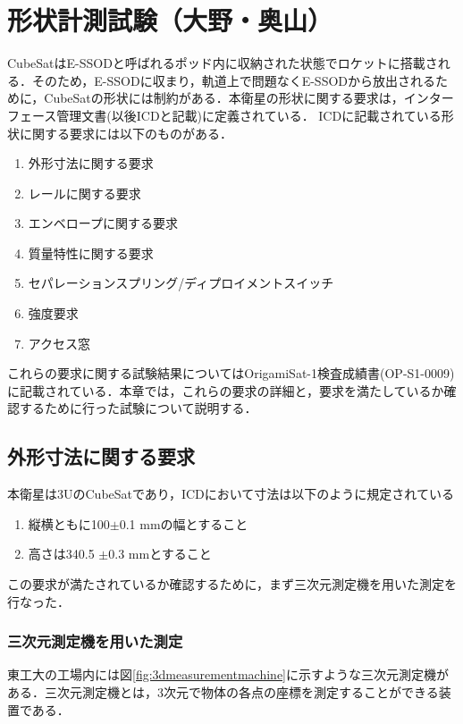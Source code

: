 \section{形状計測試験（大野・奥山）}
\label{chap:shapemeasurement}

CubeSatはE-SSODと呼ばれるポッド内に収納された状態でロケットに搭載される．そのため，E-SSODに収まり，軌道上で問題なくE-SSODから放出されるために，CubeSatの形状には制約がある．本衛星の形状に関する要求は，インターフェース管理文書(以後ICDと記載)に定義されている．
ICDに記載されている形状に関する要求には以下のものがある．
\begin{enumerate}
	\item 外形寸法に関する要求
	\item レールに関する要求
	\item エンベロープに関する要求
	\item 質量特性に関する要求
	\item セパレーションスプリング/ディプロイメントスイッチ
	\item 強度要求
	\item アクセス窓
\end{enumerate}

これらの要求に関する試験結果についてはOrigamiSat-1検査成績書(OP-S1-0009)に記載されている．本章では，これらの要求の詳細と，要求を満たしているか確認するために行った試験について説明する．

\subsection{外形寸法に関する要求}

本衛星は3UのCubeSatであり，ICDにおいて寸法は以下のように規定されている

\begin{enumerate}
	\item 縦横ともに100$\pm$0.1 mmの幅とすること
	\item 高さは340.5 $\pm$0.3 mmとすること
\end{enumerate}

この要求が満たされているか確認するために，まず三次元測定機を用いた測定を行なった．

\subsubsection{三次元測定機を用いた測定}

東工大の工場内には図\ref{fig:3dmeasurementmachine}に示すような三次元測定機がある．三次元測定機とは，3次元で物体の各点の座標を測定することができる装置である．

